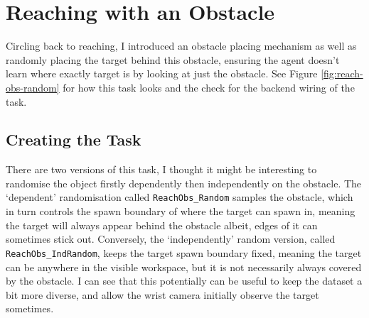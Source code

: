 \section{Reaching with an Obstacle}
Circling back to reaching, I introduced an obstacle placing mechanism as well as randomly placing the target behind this obstacle, ensuring the agent doesn't learn where exactly target is by looking at just the obstacle\todo[color=purple]. See Figure \ref{fig:reach-obs-random} for how this task looks and the check  for the backend wiring of the task.

\subsection{Creating the Task}
There are two versions of this task, I thought it might be interesting to randomise the object firstly dependently then independently on the obstacle. The `dependent' randomisation called \verb|ReachObs_Random| samples the obstacle, which in turn controls the spawn boundary of where the target can spawn in, meaning the target will always appear behind the obstacle albeit, edges of it can sometimes stick out. Conversely, the `independently' random version, called \verb|ReachObs_IndRandom|, keeps the target spawn boundary fixed, meaning the target can be anywhere in the visible workspace, but it is not necessarily always covered by the obstacle. I can see that this potentially can be useful to keep the dataset a bit more diverse, and allow the wrist camera initially observe the target sometimes.

